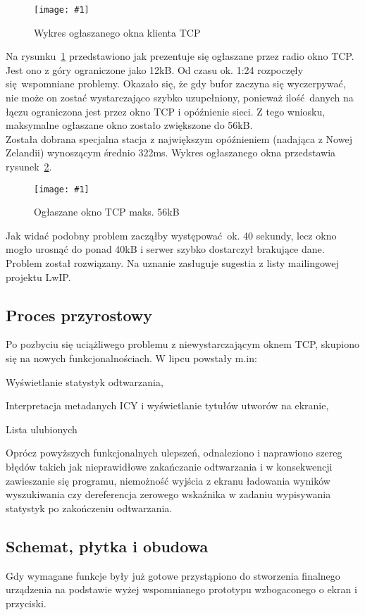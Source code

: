 \documentclass[12pt]{report}
\let\tempone\itemize
\let\temptwo\enditemize
\renewenvironment{itemize}{\tempone\setlength{\itemsep}{0cm}}{\temptwo}
\newcommand{\imgint}[4]{
	\begin{figure}[{#4}]
		\centering
		\texttt{[image: \#1]}
		\caption{#2}
		\label{#1}
	\end{figure}
}
\newcommand{\imgh}[3]{\imgint{#1}{#2}{#3}{H}}
\begin{document}
			\imgh{4/tcp_fail}{Wykres ogłaszanego okna klienta TCP}{0.85}
			
			Na rysunku~\ref{4/tcp_fail} przedstawiono jak prezentuje się ogłaszane przez radio okno TCP. Jest ono z góry ograniczone jako 12kB. Od czasu ok. 1:24 rozpoczęły się wspomniane problemy. Okazało się, że gdy bufor zaczyna się wyczerpywać, nie może on zostać wystarczająco szybko uzupełniony, ponieważ ilość danych na łączu ograniczona jest przez okno TCP i opóźnienie sieci. Z tego wniosku, maksymalne ogłaszane okno zostało zwiększone do 56kB.
			$ $\\
			
			Została dobrana specjalna stacja z największym opóźnieniem (nadająca z Nowej Zelandii) wynoszącym średnio 322ms. Wykres ogłaszanego okna przedstawia rysunek~\ref{4/tcp_good}.
			
			\imgh{4/tcp_good}{Ogłaszane okno TCP maks. 56kB}{0.6}

			Jak widać podobny problem zacząłby występować ok. 40 sekundy, lecz okno mogło urosnąć do ponad 40kB i serwer szybko dostarczył brakujące dane. Problem został rozwiązany. Na uznanie zasługuje sugestia z listy mailingowej projektu LwIP. %
			
		\subsection{Proces przyrostowy}
			Po pozbyciu się uciążliwego problemu z niewystarczającym oknem TCP, skupiono się na nowych funkcjonalnościach. W lipcu powstały m.in:
			\begin{itemize}
				\item Wyświetlanie statystyk odtwarzania,
				\item Interpretacja metadanych ICY i wyświetlanie tytułów utworów na ekranie,
				\item Lista ulubionych
			\end{itemize}
			
			Oprócz powyższych funkcjonalnych ulepszeń, odnaleziono i naprawiono szereg błędów takich jak nieprawidłowe zakańczanie odtwarzania i w konsekwencji zawieszanie się programu, niemożność wyjścia z ekranu ładowania wyników wyszukiwania czy dereferencja zerowego wskaźnika w zadaniu wypisywania statystyk po zakończeniu odtwarzania.
			
		\subsection{Schemat, płytka i obudowa}
			Gdy wymagane funkcje były już gotowe przystąpiono do stworzenia finalnego urządzenia na podstawie wyżej wspomnianego prototypu wzbogaconego o ekran i przyciski.
			$ $\\
			
\end{document}
